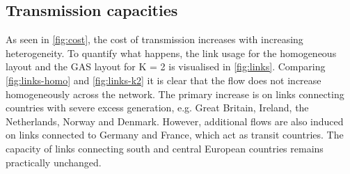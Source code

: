 \documentclass[a4paper, 5p, sort&compress]{elsarticle}%
\begin{document}
\subsection{Transmission capacities}

As seen in \cref{fig:cost}, the cost of transmission increases with increasing
heterogeneity. To quantify what happens, the link usage for the homogeneous layout and the GAS
layout for K = 2 is visualised in \cref{fig:links}. Comparing \cref{fig:links-homo} and
\cref{fig:links-k2} it is clear that the flow does not increase homogeneously across the
network. The primary increase is on links connecting countries with severe excess generation,
e.g. Great Britain, Ireland, the Netherlands, Norway and Denmark. %
However, additional flows are also induced on links connected to Germany and France, which act
as transit countries. The capacity of links connecting south and central European countries
remains practically unchanged.
\end{document}
